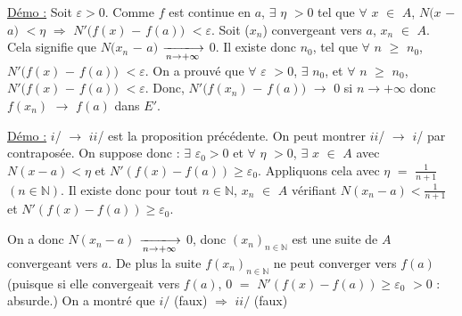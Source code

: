 \documentclass{article}
\begin{document}
\parindent=0cm
\smallbreak
\underline{Démo :} \parindent=1cm \smallbreak
Soit $\varepsilon>0$. Comme $f$ est continue en $a$, $\exists$  $\eta$ $>0$ tel que $\forall$ $x$ $\in$ $A$, $N(x$ $-$ $a)$ $<\eta$ $\Longrightarrow$ $N'(f(x)$ $-$ $f(a))$ $< \varepsilon$.
\smallbreak 
Soit ($x_n$) convergeant vers $a$, $x_n$ $\in$ $A$. Cela signifie que $N(x_n$ $-$ $a)$ $\tendplusinf$ $0$. Il existe donc $n_0$, tel que \smallbreak$\forall$ $n$ $\geqslant$ $n_0$, $N'(f(x)$ $-$ $f(a))$ $< \varepsilon$. On a prouvé que $\forall$ $\varepsilon$ $>0$, $\exists$  $n_0$, et $\forall$ $n$ $\geqslant$ $n_0$, $N'(f(x)$ $-$ $f(a))$ $< \varepsilon$.
\smallbreak Donc, $N'(f(x_n)$ $-$ $f(a))$ $\longrightarrow$ $0$ si $n\longrightarrow +\infty$ donc $f(x_n)$ $\longrightarrow$ $f(a)$ dans $E'$.

\parindent=0cm

\parindent=0cm
\smallbreak
\underline{Démo :} \parindent=1cm \smallbreak
$i$/ $\longrightarrow$ $ii$/ est la proposition précédente.
\smallbreak
On peut montrer $ii$/ $\longrightarrow$ $i$/ par contraposée. On suppose donc : $\exists$ $\varepsilon_0 >0$ et $\forall$ $\eta$ $>0$, $\exists$ $x$ $\in$ $A$ avec \smallbreak $N(x - a)< \eta$ et $N'(f(x) - f(a)) \geqslant \varepsilon_0$.
\smallbreak
Appliquons cela avec $\eta$ $=$ $\frac{1}{n+1}$ $(n \in \mathbb{N})$. Il existe donc pour tout $n \in \mathbb{N}$, $x_n$ $\in$ $A$ vérifiant $N(x_n - a)< \frac{1}{n+1}$ et \smallbreak $N'(f(x) - f(a)) \geqslant \varepsilon_0$.

\smallbreak
On a donc $N(x_n - a)$ $\tendplusinf$ $0$, donc $(x_n)_{n \in \mathbb{N}}$ est une suite de $A$ convergeant vers $a$. De plus la suite \smallbreak $f(x_n)_{n \in \mathbb{N}}$ ne peut converger vers $f(a)$ (puisque si elle convergeait vers $f(a)$, $0$ $=$ \liminfty $N'(f(x) - f(a)) \geqslant \varepsilon_0$ \smallbreak $>0$ : absurde.) On a montré que $i/$ (faux) $\Longrightarrow$ $ii/$ (faux)
\end{document}
